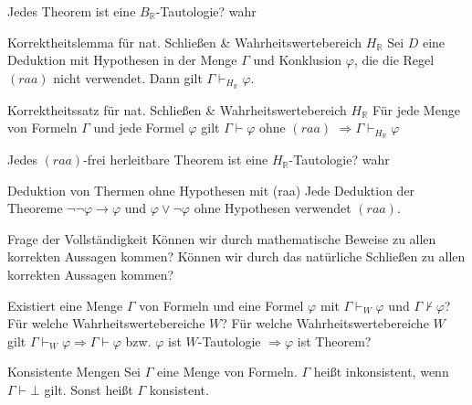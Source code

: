 \documentclass[avery5371]{flashcards}
\begin{document}
\begin{flashcard}[ Korrekheit ]{ Jedes Theorem ist eine $B_\mathbb{R}$-Tautologie? }
    wahr
\end{flashcard}

\begin{flashcard}[ Korrekheit ]{ Korrektheitslemma für nat. Schließen \& Wahrheitswertebereich  $H_{\mathbb{R}}$ }
    Sei $D$ eine Deduktion mit Hypothesen in der Menge $\Gamma$ und Konklusion $\varphi$, die die Regel $(raa)$ nicht verwendet. Dann gilt $\Gamma\vdash_{H_\mathbb{R}}\varphi$.

\end{flashcard}

\begin{flashcard}[ Korrekheit ]{ Korrektheitssatz für nat. Schließen \& Wahrheitswertebereich  $H_{\mathbb{R}}$ }
    Für jede Menge von Formeln $\Gamma$ und jede Formel $\varphi$ gilt $\Gamma\vdash\varphi$ ohne $(raa)$ $\Rightarrow\Gamma\vdash_{H_{\mathbb{R}}}\varphi$
\end{flashcard}

\begin{flashcard}[ Korrekheit ]{ Jedes $(raa)$-frei herleitbare Theorem ist eine $H_{\mathbb{R}}$-Tautologie? }
    wahr
\end{flashcard}

\begin{flashcard}[ Korrekheit ]{ Deduktion von Thermen ohne Hypothesen mit (raa) }
    Jede Deduktion der Theoreme $\lnot\lnot\varphi\rightarrow\varphi$ und $\varphi\vee\lnot\varphi$ ohne Hypothesen verwendet $(raa)$.
\end{flashcard}

\begin{flashcard}[ Vollständigkeit ]{ Frage der Vollständigkeit }
    Können wir durch mathematische Beweise zu allen korrekten Aussagen kommen?
    Können wir durch das natürliche Schließen zu allen korrekten Aussagen kommen?

    Existiert eine Menge $\Gamma$ von Formeln und eine Formel $\varphi$ mit $\Gamma\vdash_W\varphi$ und $\Gamma\not\vdash\varphi$? Für welche Wahrheitswertebereiche $W$?
    Für welche Wahrheitswertebereiche $W$ gilt $\Gamma\vdash_W \varphi\Rightarrow\Gamma\vdash\varphi$ bzw. $\varphi$ ist $W$-Tautologie $\Rightarrow\varphi$ ist Theorem?

\end{flashcard}

\begin{flashcard}[ Vollständigkeit ]{ Konsistente Mengen }
    Sei $\Gamma$ eine Menge von Formeln. $\Gamma$ heißt inkonsistent, wenn $\Gamma\vdash\bot$ gilt. Sonst heißt $\Gamma$ konsistent.
\end{flashcard}
\end{document}
